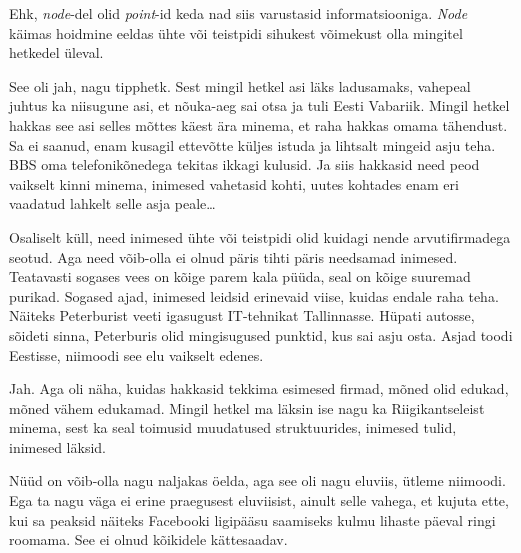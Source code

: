 Ehk, \emph{node}-del olid \emph{point}-id keda nad siis varustasid 
informatsiooniga. \emph{Node} käimas hoidmine eeldas ühte või teistpidi 
sihukest võimekust olla  mingitel hetkedel üleval.
                 

See oli jah, nagu tipphetk. Sest mingil hetkel asi läks ladusamaks, vahepeal 
juhtus ka niisugune asi, et  nõuka-aeg sai otsa ja tuli Eesti Vabariik. Mingil 
hetkel hakkas see asi selles mõttes käest ära minema, et raha hakkas omama 
tähendust. Sa ei saanud, enam kusagil ettevõtte küljes istuda ja lihtsalt 
mingeid asju teha. BBS oma telefonikõnedega tekitas ikkagi kulusid. Ja siis 
hakkasid need peod vaikselt kinni minema, inimesed vahetasid kohti, uutes 
kohtades enam eri vaadatud lahkelt selle asja peale\ldots


Osaliselt küll, need inimesed ühte või teistpidi olid kuidagi nende 
arvutifirmadega seotud. Aga need võib-olla ei olnud päris tihti päris needsamad 
inimesed. Teatavasti sogases vees on kõige parem kala püüda, seal on kõige 
suuremad purikad. Sogased ajad, inimesed leidsid erinevaid viise, kuidas endale 
raha teha. Näiteks Peterburist veeti igasugust IT-tehnikat Tallinnasse. Hüpati 
autosse, sõideti sinna, Peterburis olid mingisugused punktid, kus sai asju 
osta. Asjad toodi Eestisse, niimoodi see elu vaikselt edenes.
                 
         

Jah. Aga oli näha, kuidas hakkasid tekkima esimesed firmad, mõned olid edukad, 
mõned vähem edukamad. Mingil hetkel ma läksin ise nagu ka Riigikantseleist 
minema, sest ka seal toimusid muudatused struktuurides, inimesed tulid, 
inimesed läksid.


Nüüd on võib-olla nagu naljakas öelda, aga see oli nagu eluviis, ütleme 
niimoodi. Ega ta nagu väga ei erine praegusest eluviisist, ainult selle vahega, 
et kujuta ette, kui sa peaksid näiteks Facebooki ligipääsu saamiseks kulmu 
lihaste päeval ringi roomama. See ei olnud kõikidele kättesaadav. 
                 
